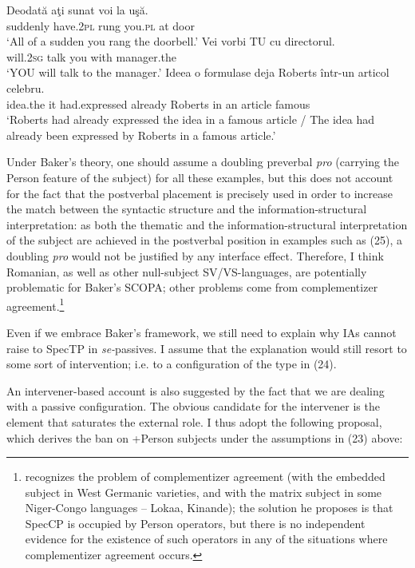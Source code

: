 \documentclass[output=paper]{langsci/langscibook}
\begin{document}
\ea%
    \label{ex:giurgea:25}
    \ea
    \gll Deodată   aţi           sunat   voi     la  uşă.  \\
          suddenly have.\textsc{2pl}  rung   you.\textsc{pl}   at door\\
    \glt ‘All of a sudden you rang the doorbell.’
    \ex
    \gll Vei        vorbi TU  cu    directorul.         \\
         will.\textsc{2sg} talk    you with manager.the\\
    \glt ‘YOU will talk to the manager.’
    \ex
    \gll Ideea    o formulase         deja      Roberts într-un articol celebru. \\
         idea.the it had.expressed already Roberts  {in  an} article  famous    \\
    \glt ‘Roberts had already expressed the idea in a famous article / The idea had already been expressed by Roberts in a famous article.’
    \z
\z       

Under Baker’s theory, one should assume a doubling preverbal \textit{pro} (carrying the Person feature of the subject) for all these examples, but this does not account for the fact that the postverbal placement is precisely used in order to increase the match between the syntactic structure and the information-structural interpretation: as both the thematic and the information-structural interpretation of the subject are achieved in the postverbal position in examples such as (25), a doubling \textit{pro} would not be justified by any interface effect. Therefore, I think Romanian, as well as other null-subject SV\slash VS-languages, are potentially problematic for Baker’s SCOPA; other problems come from complementizer agreement.\footnote{\citet{Baker2008} recognizes the problem of complementizer agreement (with the embedded subject in West Germanic varieties, and with the matrix subject in some Niger-Congo languages – Lokaa, Kinande); the solution he proposes is that SpecCP is occupied by Person operators, but there is no independent evidence for the existence of such operators in any of the situations where complementizer agreement occurs.}

  Even if we embrace Baker’s framework, we still need to explain why IAs cannot raise to SpecTP in \textit{se-}passives. I assume that the explanation would still resort to some sort of intervention; i.e. to a configuration of the type in (24). 

  An intervener-based account is also suggested by the fact that we are dealing with a passive configuration. The obvious candidate for the intervener is the element that saturates the external role. I thus adopt the following proposal, which derives the ban on +Person subjects under the assumptions in (23) above:
\end{document}
